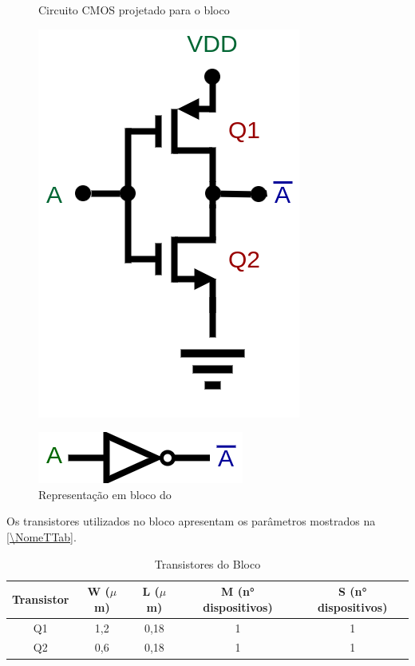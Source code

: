\begin{figure}[htb]
 \centering
  \begin{minipage}{0.4\textwidth}
    \centering
    \caption{Circuito CMOS projetado para o bloco \NomeBloco} \label{\NomePFig}
    \includegraphics[scale=0.3]{Circuitos/NOT.png}
  \end{minipage}
  \hfill
  \begin{minipage}{0.4\textwidth}
    \centering
    \caption{Representa{\c c}\~ao em bloco do \NomeBloco} \label{NomeSFig}
    \includegraphics[scale=0.3]{Circuitos/NOT_block.png}
  \end{minipage}
\end{figure}

Os transistores utilizados no bloco \NomeBloco{} apresentam os par\^ametros mostrados na \autoref{\NomeTTab}.

\begin{table}[htbp]
\caption{Transistores do Bloco \NomeBloco}
\label{\NomeTTab}
\centering
\begin{tabular}{ccccc}
\toprule
Transistor & W ($\mu$m)  & L ($\mu$m)           & M (n° dispositivos) & S (n° dispositivos)\\
\midrule \midrule
Q1 & 1,2 & 0,18 & 1 & 1\\
\midrule
Q2 & 0,6 & 0,18 & 1 & 1\\
\bottomrule
\end{tabular}
\end{table}